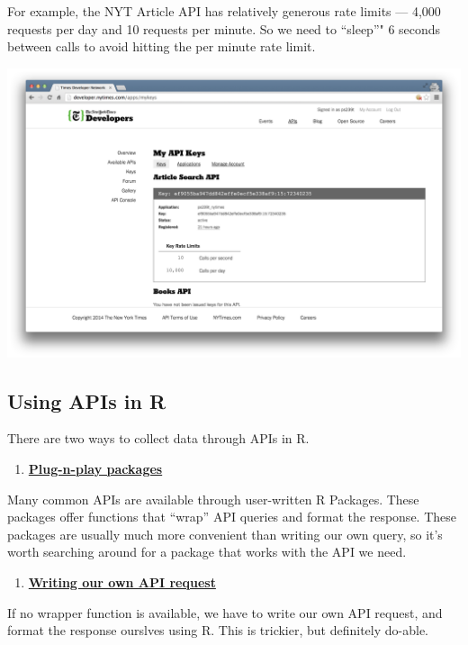 \documentclass[]{book}
\providecommand{\tightlist}{%
  \setlength{\itemsep}{0pt}\setlength{\parskip}{0pt}}
\begin{document}
For example, the NYT Article API has relatively generous rate limits ---
4,000 requests per day and 10 requests per minute. So we need to
``sleep''" 6 seconds between calls to avoid hitting the per minute rate
limit.

\begin{center}\includegraphics[width=0.7\linewidth]{img/nytimes_key} \end{center}

\subsection{Using APIs in R}\label{using-apis-in-r}

There are two ways to collect data through APIs in R.

\begin{enumerate}
\def\labelenumi{\arabic{enumi}.}
\tightlist
\item
  \protect\hyperlink{collecting-twitter-data-with-rtweet}{\textbf{Plug-n-play
  packages}}
\end{enumerate}

Many common APIs are available through user-written R Packages. These
packages offer functions that ``wrap'' API queries and format the
response. These packages are usually much more convenient than writing
our own query, so it's worth searching around for a package that works
with the API we need.

\begin{enumerate}
\def\labelenumi{\arabic{enumi}.}
\setcounter{enumi}{1}
\tightlist
\item
  \protect\hyperlink{writing-api-queries}{\textbf{Writing our own API
  request}}
\end{enumerate}

If no wrapper function is available, we have to write our own API
request, and format the response ourslves using R. This is trickier, but
definitely do-able.
\end{document}
